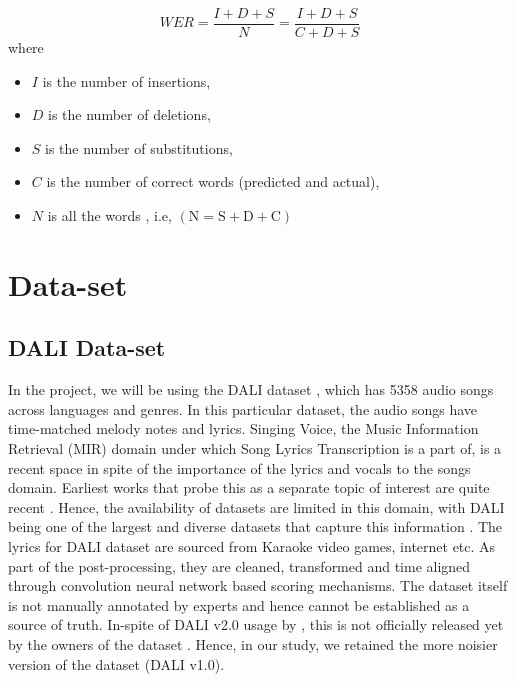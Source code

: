 $$
W E R=\frac{I + D + S}{N}=\frac{I+D+S}{C+D+S}
$$
where

\begin{itemize}
    \item $I$ is the number of insertions,
    \item $D$ is the number of deletions,
    \item $S$ is the number of substitutions,
    \item $C$ is the number of correct words (predicted and actual),

    \item $N$ is all the words , i.e, $(\mathrm{N}=\mathrm{S}+\mathrm{D}+\mathrm{C})$
\end{itemize}


\section{Data-set}%
\label{sec:dataset}

\subsection{DALI Data-set}
\label{subsec:dalidataset}

In the project, we will be using the DALI dataset \cite{meseguer2020creating}, which has 5358 audio songs across languages and genres. In this particular dataset, the audio songs have time-matched melody notes and lyrics. Singing Voice, the Music Information Retrieval (MIR) domain under which Song Lyrics Transcription is a part of, is a recent space in spite of the importance of the lyrics and vocals to the songs domain. Earliest works that probe this as a separate topic of interest are quite recent \cite{fujihara2012lyrics} \cite{mesaros2013singing}. Hence, the availability of datasets are limited in this domain, with DALI being one of the largest and diverse datasets that capture this information \cite{ou2022transfer}. The lyrics for DALI dataset are sourced from Karaoke video games, internet etc. As part of the post-processing, they are cleaned, transformed and time aligned through convolution neural network based scoring mechanisms. The dataset itself is not manually annotated by experts and hence cannot be established as a source of truth. In-spite of DALI v2.0 usage by \cite{ou2022transfer}, this is not officially released yet by the owners of the dataset \cite{dalireleases}. Hence, in our study, we retained the more noisier version of the dataset (DALI v1.0).

